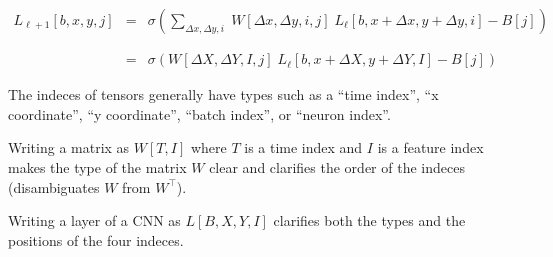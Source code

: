 {{\huge
\begin{eqnarray*}
L_{{\ell+1}}[b,x,y,j] & = & \sigma\left(\sum_{\Delta x,\Delta y,i}\;W[\Delta x, \Delta y, i,j]\; L_{{\ell}}[b,x + \Delta x, y + \Delta y, i] - B[j]\right) \\
\\
\\
& = & \sigma\left(W[\Delta X, \Delta Y, I,j]\; L_{{\ell}}[b,x + \Delta X, y + \Delta Y, I] - B[j]\right)
\end{eqnarray*}
}

The indeces of tensors generally have types such as a ``time index'', ``x coordinate'', ``y coordinate'', ``batch index'', or ``neuron index''.

\vfill
Writing a matrix as $W[T,I]$ where $T$ is a time index and $I$ is a feature index makes the type of the matrix $W$ clear and clarifies
the order of the indeces (disambiguates $W$ from $W^\top$).

\vfill
Writing a layer of a CNN as $L[B,X,Y,I]$ clarifies both the types and the positions of the four indeces.

}


